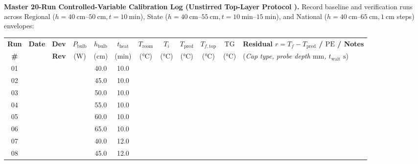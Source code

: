 \par\noindent\textbf{Master 20-Run Controlled-Variable Calibration Log (Unstirred Top-Layer Protocol ).}
Record baseline and verification runs across Regional ($h=\SIrange{40}{50}{\centi\meter}, t=\SI{10}{\minute}$), State ($h=\SIrange{40}{55}{\centi\meter}, t=\SIrange{10}{15}{\minute}$), and National ($h=\SIrange{40}{65}{\centi\meter}, \SI{1}{\centi\meter}$ steps) envelopes:
\par\smallskip\noindent
{\scriptsize\setlength{\tabcolsep}{2.5pt}\renewcommand{\arraystretch}{1.34}
\begin{tabularx}{\linewidth}{@{}c c c c c c c c c c c >{\raggedright\arraybackslash}X@{}}
\toprule
\textbf{Run} & \textbf{Date} & \textbf{Dev} & $P_{\mathrm{bulb}}$ & $h_{\mathrm{bulb}}$ & $t_{\mathrm{heat}}$ & $T_{\mathrm{room}}$ & $T_i$ & $T_{\mathrm{pred}}$ & $T_{f,\mathrm{top}}$ & $\mathrm{TG}$ & \textbf{Residual $r = T_f - T_{\mathrm{pred}}$ / $\mathrm{PE}$ / Notes} \\
\textbf{\#} & & \textbf{Rev} & ($\si{\watt}$) & ($\si{\centi\meter}$) & ($\si{\minute}$) & ($\si{\celsius}$) & ($\si{\celsius}$) & ($\si{\celsius}$) & ($\si{\celsius}$) & ($\si{\celsius}$) & (\emph{Cap type, probe depth $\si{\milli\meter}$, $t_{\mathrm{wait}}$ $\si{\second}$}) \\
\midrule
01 & \dotfill & \dotfill & \dotfill & 40.0 & 10.0 & \dotfill & \dotfill & \dotfill & \dotfill & \dotfill & \dotfill \\
\rowcolor{rowalt}02 & \dotfill & \dotfill & \dotfill & 45.0 & 10.0 & \dotfill & \dotfill & \dotfill & \dotfill & \dotfill & \dotfill \\
03 & \dotfill & \dotfill & \dotfill & 50.0 & 10.0 & \dotfill & \dotfill & \dotfill & \dotfill & \dotfill & \dotfill \\
\rowcolor{rowalt}04 & \dotfill & \dotfill & \dotfill & 55.0 & 10.0 & \dotfill & \dotfill & \dotfill & \dotfill & \dotfill & \dotfill \\
05 & \dotfill & \dotfill & \dotfill & 60.0 & 10.0 & \dotfill & \dotfill & \dotfill & \dotfill & \dotfill & \dotfill \\
\rowcolor{rowalt}06 & \dotfill & \dotfill & \dotfill & 65.0 & 10.0 & \dotfill & \dotfill & \dotfill & \dotfill & \dotfill & \dotfill \\
07 & \dotfill & \dotfill & \dotfill & 40.0 & 12.0 & \dotfill & \dotfill & \dotfill & \dotfill & \dotfill & \dotfill \\
\rowcolor{rowalt}08 & \dotfill & \dotfill & \dotfill & 45.0 & 12.0 & \dotfill & \dotfill & \dotfill & \dotfill & \dotfill & \dotfill \\

\end{tabularx}}

